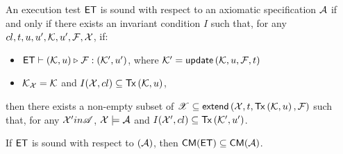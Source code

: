 \begin{definition}
\label{def:main-body-et_sound}
An execution test $\mathsf{ET}$ is sound with respect to an axiomatic 
specification $\mathcal{A}$ if and only if
there exists an invariant condition $I$ such that, 
for any ${cl}, t, u, u', \mathcal{K}, u', \mathcal{F}, \mathcal{X}$, if:
\begin{itemize}
    \item $\mathsf{ET} \vdash (\mathcal{K}, u) \triangleright_{} \mathcal{F}: (\mathcal{K}',u')$, where \( \mkvs' = \updateKV[\mkvs, \vi ,\fp, \txid]\)
    \item  $\mathcal{K}_{\mathcal{X}} = \mathcal{K}$ and $I(\aexec, \cl) \subseteq \Tx[\mkvs, \vi]$,
\end{itemize}
then there exists a non-empty subset of $\mathscr{X} \subseteq \extend[\aexec, \txid, \Tx[\hh, \vi], \fp]$ 
such that, for any $\mathcal{X}' in \mathscr{A}$, $\mathcal{X} \models \mathcal{A}$ and $I(\aexec', \cl) \subseteq \Tx[\mkvs', \vi']$.
%
\end{definition}

\begin{theorem}
\label{thm:main-body-et_soundness}
If $\mathsf{ET}$ is sound with respect to $(\mathcal{A})$, then $\CMs(\ET) \subseteq \CMs(\Ax)$.
\end{theorem}

